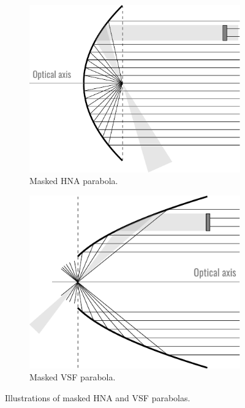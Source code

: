 \documentclass[11pt,SymmetricalJury]{inrsthesis/inrsthesis}
\begin{document}
\begin{figure}
  \begin{subfigure}[t]{0.47\textwidth}
    \centering
    \includegraphics{figs/masked_parabola_hna.pdf}
    \caption{Masked HNA parabola.}
    \label{fig:fwm.vsf-v-hna.hna}
  \end{subfigure}
  \hfill
  \begin{subfigure}[t]{0.47\textwidth}
    \centering
    \includegraphics{figs/masked_parabola_vsf.pdf}
    \caption{Masked VSF parabola.}
    \label{fig:fwm.vsf-v-hna.vsf}
  \end{subfigure}
  \caption[Illustrations of the masked HNA and VSF parabolas.]
          {Illustrations of masked HNA and VSF parabolas.}
  \label{fig:fwm.vsf-v-hna}
\end{figure}
\end{document}
